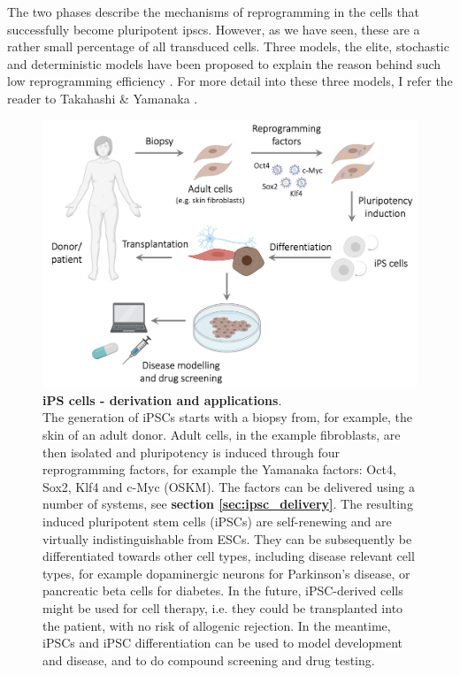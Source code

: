 The two phases describe the mechanisms of reprogramming in the cells that successfully become pluripotent \glspl{ipsc}.
However, as we have seen, these are a rather small percentage of all transduced cells.
Three models, the elite, stochastic and deterministic models have been proposed to explain the reason behind such low reprogramming efficiency \cite{omole2018ten}.
For more detail into these three models, I refer the reader to Takahashi \& Yamanaka \cite{takahashi2016decade}.

\begin{figure}[htbp]
\centering
\includegraphics[width=14cm]{Chapter1/Fig/ipscs.png}
\caption[iPS cells]{\textbf{iPS cells - derivation and applications}.\\
The generation of iPSCs starts with a biopsy from, for example, the skin of an adult donor.
Adult cells, in the example fibroblasts, are then isolated and pluripotency is induced through four reprogramming factors, for example the Yamanaka factors: Oct4, Sox2, Klf4 and c-Myc (OSKM).
The factors can be delivered using a number of systems, see \textbf{section \ref{sec:ipsc_delivery}}.
The resulting induced pluripotent stem cells (iPSCs) are self-renewing and are virtually indistinguishable from ESCs.
They can be subsequently be differentiated towards other cell types, including disease relevant cell types, for example dopaminergic neurons for Parkinson's disease, or pancreatic beta cells for diabetes.
In the future, iPSC-derived cells might be used for cell therapy, i.e. they could be transplanted into the patient, with no risk of allogenic rejection.
In the meantime, iPSCs and iPSC differentiation can be used to model development and disease, and to do compound screening and drug testing.}
\label{fig:ipsc}
\end{figure}

